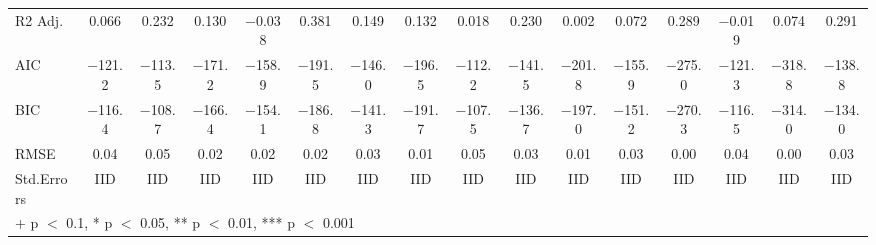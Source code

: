 \begin{table}
\begin{tabular}[t]{lccccccccccccccc}
R2 Adj. & \num{0.066} & \num{0.232} & \num{0.130} & \num{-0.038} & \num{0.381} & \num{0.149} & \num{0.132} & \num{0.018} & \num{0.230} & \num{0.002} & \num{0.072} & \num{0.289} & \num{-0.019} & \num{0.074} & \num{0.291}\\
AIC & \num{-121.2} & \num{-113.5} & \num{-171.2} & \num{-158.9} & \num{-191.5} & \num{-146.0} & \num{-196.5} & \num{-112.2} & \num{-141.5} & \num{-201.8} & \num{-155.9} & \num{-275.0} & \num{-121.3} & \num{-318.8} & \num{-138.8}\\
BIC & \num{-116.4} & \num{-108.7} & \num{-166.4} & \num{-154.1} & \num{-186.8} & \num{-141.3} & \num{-191.7} & \num{-107.5} & \num{-136.7} & \num{-197.0} & \num{-151.2} & \num{-270.3} & \num{-116.5} & \num{-314.0} & \num{-134.0}\\
RMSE & \num{0.04} & \num{0.05} & \num{0.02} & \num{0.02} & \num{0.02} & \num{0.03} & \num{0.01} & \num{0.05} & \num{0.03} & \num{0.01} & \num{0.03} & \num{0.00} & \num{0.04} & \num{0.00} & \num{0.03}\\
Std.Errors & IID & IID & IID & IID & IID & IID & IID & IID & IID & IID & IID & IID & IID & IID & IID\\
\bottomrule
\multicolumn{16}{l}{\rule{0pt}{1em}+ p $<$ 0.1, * p $<$ 0.05, ** p $<$ 0.01, *** p $<$ 0.001}\\
\end{tabular}
\end{table}
